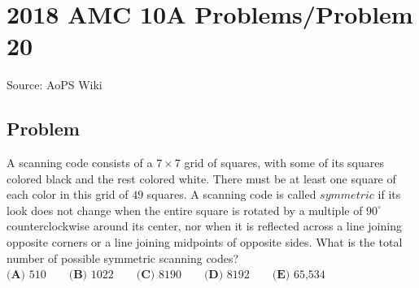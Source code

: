 \documentclass[12pt]{article}
\begin{document}
\section*{{2018 AMC 10A Problems/Problem 20}}
Source: AoPS Wiki

\subsection*{Problem}
A scanning code consists of a $7 \times 7$ grid of squares, with some of its squares colored black and the rest colored white. There must be at least one square of each color in this grid of $49$ squares. A scanning code is called $\textit{symmetric}$ if its look does not change when the entire square is rotated by a multiple of $90 ^{\circ}$ counterclockwise around its center, nor when it is reflected across a line joining opposite corners or a line joining midpoints of opposite sides. What is the total number of possible symmetric scanning codes? $\textbf{(A)} \text{ 510} \qquad \textbf{(B)} \text{ 1022} \qquad \textbf{(C)} \text{ 8190} \qquad \textbf{(D)} \text{ 8192} \qquad \textbf{(E)} \text{ 65,534}$
\end{document}
